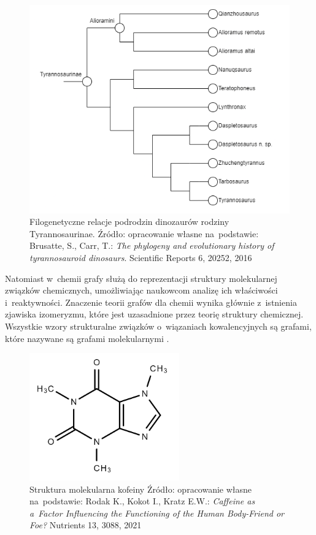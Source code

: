 \begin{figure}[ht]
	\centering
	\includegraphics[width=12cm]{resources/introduction/images/dino.png}
	\caption{Filogenetyczne relacje podrodzin dinozaurów rodziny Tyrannosaurinae.
		Źródło: opracowanie własne na~podstawie:
		Brusatte, S., Carr, T.: \textit{The phylogeny and evolutionary history of tyrannosauroid dinosaurs}. Scientific Reports 6, 20252, 2016}
    \label{Fig:intro-3}
\end{figure}
\FloatBarrier

Natomiast w~chemii grafy służą do reprezentacji struktury molekularnej związków chemicznych,
umożliwiając naukowcom analizę ich właściwości i~reaktywności.
Znaczenie teorii grafów dla chemii wynika głównie z~istnienia zjawiska izomeryzmu,
które jest uzasadnione przez teorię struktury chemicznej.
Wszystkie wzory strukturalne związków o~wiązaniach kowalencyjnych są grafami,
które nazywane są grafami molekularnymi \cite{Balaban1985}.

\begin{figure}[ht]
	\centering
	\includegraphics[height=5.5cm]{resources/introduction/images/chem.png}
	\caption{Struktura molekularna kofeiny
		Źródło: opracowanie własne na~podstawie:
		Rodak K., Kokot I., Kratz E.W.: \textit{Caffeine as a~Factor Influencing the Functioning of the Human Body-Friend or Foe?} Nutrients 13, 3088, 2021}
    \label{Fig:intro-4}
\end{figure}
\FloatBarrier

